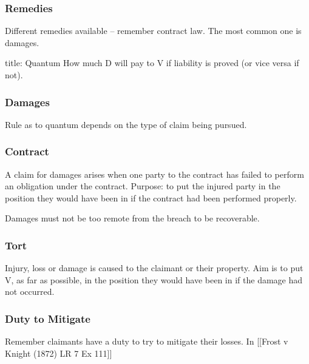 \documentclass[
]{article}
\newenvironment{Shaded}{}{}
\newcommand{\NormalTok}[1]{#1}
\begin{document}
\hypertarget{remedies}{%
\subsubsection{Remedies}\label{remedies}}

Different remedies available -- remember contract law. The most common
one is damages.

\begin{Shaded}
\begin{Highlighting}[]
\NormalTok{title: Quantum}
\NormalTok{How much D will pay to V if liability is proved (or vice versa if not).}
\end{Highlighting}
\end{Shaded}

\hypertarget{damages}{%
\subsubsection{Damages}\label{damages}}

Rule as to quantum depends on the type of claim being pursued.

\hypertarget{contract}{%
\subsubsection{Contract}\label{contract}}

A claim for damages arises when one party to the contract has failed to
perform an obligation under the contract. Purpose: to put the injured
party in the position they would have been in if the contract had been
performed properly.

Damages must not be too remote from the breach to be recoverable.

\hypertarget{tort}{%
\subsubsection{Tort}\label{tort}}

Injury, loss or damage is caused to the claimant or their property. Aim
is to put V, as far as possible, in the position they would have been in
if the damage had not occurred.

\hypertarget{duty-to-mitigate}{%
\subsubsection{Duty to Mitigate}\label{duty-to-mitigate}}

Remember claimants have a duty to try to mitigate their losses. In
{[}{[}Frost v Knight (1872) LR 7 Ex 111{]}{]}
\end{document}
